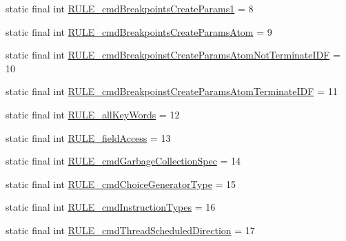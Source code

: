 \begin{DoxyCompactItemize}
\item 
static final int \hyperlink{classgov_1_1nasa_1_1jpf_1_1inspector_1_1server_1_1expression_1_1parser_1_1_expression_grammar_parser_a8abd39c2443d83b9bbcfa16eedc0f01f}{R\+U\+L\+E\+\_\+cmd\+Breakpoints\+Create\+Params1} = 8
\item 
static final int \hyperlink{classgov_1_1nasa_1_1jpf_1_1inspector_1_1server_1_1expression_1_1parser_1_1_expression_grammar_parser_ad0c8fc596b444f6cd7d58fab3d7f28d2}{R\+U\+L\+E\+\_\+cmd\+Breakpoints\+Create\+Params\+Atom} = 9
\item 
static final int \hyperlink{classgov_1_1nasa_1_1jpf_1_1inspector_1_1server_1_1expression_1_1parser_1_1_expression_grammar_parser_a59c98c595cc9a8f02dfc8619b41471b5}{R\+U\+L\+E\+\_\+cmd\+Breakpoinst\+Create\+Params\+Atom\+Not\+Terminate\+I\+DF} = 10
\item 
static final int \hyperlink{classgov_1_1nasa_1_1jpf_1_1inspector_1_1server_1_1expression_1_1parser_1_1_expression_grammar_parser_aa362e794e1e6f828f242ad134cb08a18}{R\+U\+L\+E\+\_\+cmd\+Breakpoinst\+Create\+Params\+Atom\+Terminate\+I\+DF} = 11
\item 
static final int \hyperlink{classgov_1_1nasa_1_1jpf_1_1inspector_1_1server_1_1expression_1_1parser_1_1_expression_grammar_parser_a4435dd8dfa83a7adf1551cf60e191562}{R\+U\+L\+E\+\_\+all\+Key\+Words} = 12
\item 
static final int \hyperlink{classgov_1_1nasa_1_1jpf_1_1inspector_1_1server_1_1expression_1_1parser_1_1_expression_grammar_parser_aff521471074311ffd012adc4b7330ad0}{R\+U\+L\+E\+\_\+field\+Access} = 13
\item 
static final int \hyperlink{classgov_1_1nasa_1_1jpf_1_1inspector_1_1server_1_1expression_1_1parser_1_1_expression_grammar_parser_a35acc820e8f7314c50355fe41ac69f8a}{R\+U\+L\+E\+\_\+cmd\+Garbage\+Collection\+Spec} = 14
\item 
static final int \hyperlink{classgov_1_1nasa_1_1jpf_1_1inspector_1_1server_1_1expression_1_1parser_1_1_expression_grammar_parser_a4e1b1231e6750ceecb6bd5ce8e5df3c3}{R\+U\+L\+E\+\_\+cmd\+Choice\+Generator\+Type} = 15
\item 
static final int \hyperlink{classgov_1_1nasa_1_1jpf_1_1inspector_1_1server_1_1expression_1_1parser_1_1_expression_grammar_parser_ab98b090d95afbb9162385f39d50e05fb}{R\+U\+L\+E\+\_\+cmd\+Instruction\+Types} = 16
\item 
static final int \hyperlink{classgov_1_1nasa_1_1jpf_1_1inspector_1_1server_1_1expression_1_1parser_1_1_expression_grammar_parser_a66e47277c64d0382e31cfcc7f95a6c8a}{R\+U\+L\+E\+\_\+cmd\+Thread\+Scheduled\+Direction} = 17

\end{DoxyCompactItemize}
